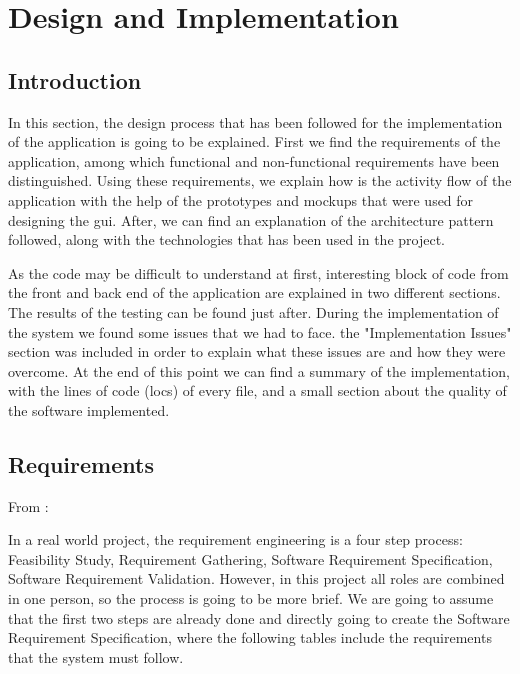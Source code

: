 \chapter{Design and Implementation}
\label{design}

\section{Introduction}
In this section, the design process that has been followed for the implementation of the application is going to be explained. First we find the requirements of the application, among which functional and non-functional requirements have been distinguished. Using these requirements, we explain how is the activity flow of the application with the help of the prototypes and mockups that were used for designing the \gls{gui}. After, we can find an explanation of the architecture pattern followed, along with the technologies that has been used in the project. 

As the code may be difficult to understand at first, interesting block of code from the front and back end of the application are explained in two different sections. The results of the testing can be found just after. During the implementation of the system we found some issues that we had to face. the "Implementation Issues" section was included in order to explain what these issues are and how they were overcome. At the end of this point we can find a summary of the implementation, with the lines of code (\glspl{loc}) of every file, and a small section about the quality of the software implemented.  

\section{Requirements}
\label{sec:requirements}
From \cite{req_engineering_def}:


In a real world project, the requirement engineering is a four step process: Feasibility Study, Requirement Gathering, Software Requirement Specification, Software Requirement Validation. However, in this project all roles are combined in one person, so the process is going to be more brief. We are going to assume that the first two steps are already done and directly going to create the Software Requirement Specification, where the following tables include the requirements that the system must follow.

